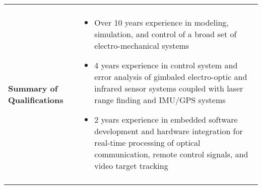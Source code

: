 \begin{tabular}{L{\lcolw}  L{\rcolw}}
 \hline \hline \\
\textbf{\Large Summary of Qualifications} &
\vspace{-0.3in} 
 \begin{itemize}[leftmargin = \itemmargin]

	\item Over 10 years experience in modeling, simulation, and control of a broad set of electro-mechanical systems
	
	\item 4 years experience in control system and error analysis of gimbaled electro-optic and infrared sensor systems coupled with laser range finding and IMU/GPS systems
	
	\item 2 years experience in embedded software development and hardware integration for real-time processing of optical communication, remote control signals, and video target tracking
	
	\end{itemize}\\
 \hline \\ 
\end{tabular}